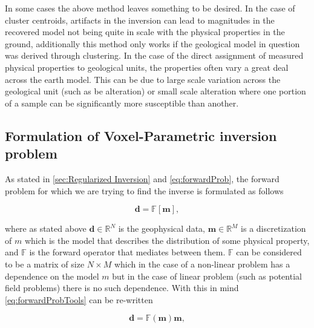 In some cases the above method leaves something to be desired. In the case of cluster centroids, artifacts in the inversion can lead to magnitudes in the recovered model not being quite in scale with the physical properties in the ground, additionally this method only works if the geological model in question was derived through clustering. In the case of the direct assignment of measured physical properties to geological units, the properties often vary a great deal across the earth model. This can be due to large scale variation across the geological unit (such as be alteration) or small scale alteration where one portion of a sample can be significantly more susceptible than another.


\subsection{Formulation of Voxel-Parametric inversion problem}
\label{subsec:voxelParamFormulation}

As stated in \autoref{sec:Regularized Inversion} and \autoref{eq:forwardProb}, the forward problem for which we are trying to find the inverse is formulated as follows

\begin{equation}
\mathbf d = \mathbb F [\mathbf m],
\end{equation}
\label{eq:forwardProbTools}

where as stated above $\mathbf d \in \mathbb R^N$ is the geophysical data, $\mathbf m \in \mathbb R^M$ is a discretization of $m$ which is the model that describes the distribution of some physical property, and $\mathbb F$ is the forward operator that mediates between them. $\mathbb F$ can be considered to be a matrix of size $N\times M$ which in the case of a non-linear problem has a dependence on the model $m$ but in the case of linear problem (such as potential field problems) there is no such dependence. With this in mind \autoref{eq:forwardProbTools} can be re-written

\begin{equation}
\mathbf d = \mathbb F(\mathbf m)\mathbf m,
\end{equation}
\label{eq:forwardProbMat}




